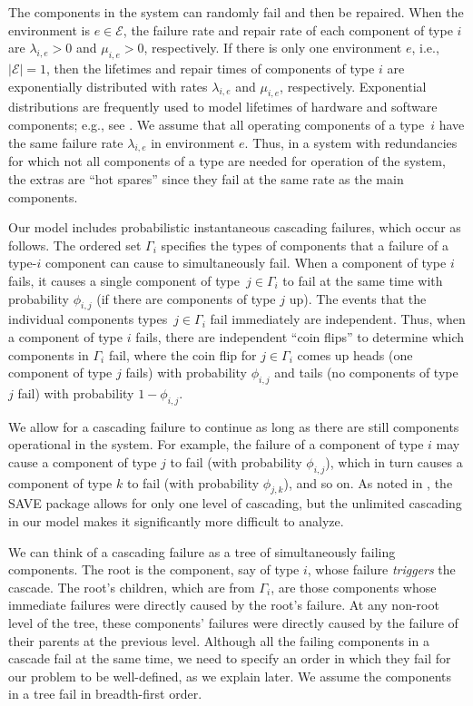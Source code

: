 \documentclass[12pt]{article}
\begin{document}
The components in the system can randomly
fail and then be repaired.
When the environment is $e \in \mathcal{E}$,
the failure rate and repair rate
of each
component of type $i$
are $\lambda_{i,e} > 0$ and $\mu_{i,e} > 0$,
respectively.  If there is only one
environment $e$, i.e., $| \mathcal{E} | = 1$,
then the lifetimes and repair times of
components of type $i$ are exponentially
distributed with rates $\lambda_{i,e}$
and $\mu_{i,e}$, respectively.
Exponential distributions are
frequently used to model
lifetimes of hardware and
software components; e.g.,
see \cite{XDP:2004}.
We assume that all operating components
of a type~$i$ have the same failure
rate $\lambda_{i,e}$ in environment $e$.
Thus, in a system with  redundancies
for which not all components of a type
are needed for operation of the system,
the extras are ``hot spares'' since
they fail at the same rate as the main
components.

Our model includes probabilistic
instantaneous cascading failures,
which occur as follows.
The ordered set $\Gamma_i$ specifies
the types of components
that a failure of a type-$i$ component
can cause to simultaneously fail.
When a component of type $i$ fails,
it causes a single 
component of type~$j \in \Gamma_i$
to fail at the same time
with probability
$\phi_{i,j}$
(if there are components of type $j$ up).
The events that the individual components
types~$j \in \Gamma_i$
fail immediately are independent.
Thus, when a component of type $i$ fails,
there are independent ``coin flips''
to determine which components in $\Gamma_i$ fail,
where the coin flip for $j \in \Gamma_i$
comes up heads (one component of
type $j$ fails) with probability $\phi_{i,j}$
and tails
(no components of type $j$ fail)
with probability $1 - \phi_{i,j}$.

We allow for a cascading failure to continue
as long as there are still components operational
in the system.  For example, the failure of
a component of type $i$ may cause
a component of type $j$ to fail
(with probability $\phi_{i,j}$),
which in turn causes a component of type $k$
to fail (with probability $\phi_{j,k}$),
and so on.
As noted in \cite{ING:2009},
the SAVE package \cite{BHLNS:1994}
allows for only one level of cascading,
but the unlimited cascading in our model
makes it significantly more difficult
to analyze.

We can think of a cascading failure
as a tree of simultaneously failing components.
The root is the component, say of type $i$,
whose failure \textit{triggers} the cascade.
The root's children, which are from
$\Gamma_i$, are those components
whose immediate failures
were directly caused by the
root's failure.
At any non-root level of the tree, 
these components'
failures were directly caused by the
failure of their parents at the previous level.
Although all the failing components
in a cascade fail at the same time,
we need to specify an order in which
they fail for our problem to
be well-defined, as we explain later.
We assume the components in a tree
fail in breadth-first order.
\end{document}

